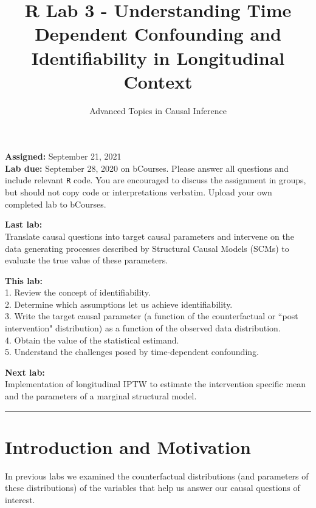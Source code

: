 \documentclass[answers]{exam}
\title{R Lab 3 - Understanding Time Dependent Confounding and Identifiability in Longitudinal Context}
\author{Advanced Topics in Causal Inference}
\date{}
\begin{document}
\maketitle



\noindent \textbf{Assigned:} September 21, 2021\\
\textbf{Lab due:} September 28, 2020 on bCourses. Please answer all questions and include relevant \texttt{R} code. You are encouraged to discuss the assignment in groups, but should not copy code or interpretations verbatim. Upload your own completed lab to bCourses.



\noindent \textbf{Last lab:} \\
Translate causal questions into target causal parameters and intervene on the data generating processes described by Structural Causal Models (SCMs) to evaluate the true value of these parameters. 


\noindent \textbf{This lab:}\\
1. Review the concept of identifiability. \\
2. Determine which assumptions let us achieve identifiability. \\
3. Write the target causal parameter (a function of the counterfactual or ``post intervention" distribution) as a function of the observed data distribution. \\
4. Obtain the value of the statistical estimand. \\
5. Understand the challenges posed by time-dependent confounding.

\noindent \textbf{Next lab:}\\
Implementation of longitudinal IPTW to estimate the intervention specific mean and the parameters of a marginal structural model.



\begin{center}
\noindent\rule{18cm}{0.4pt}
\end{center}

\section{Introduction and Motivation}

In previous labs we examined the counterfactual distributions (and parameters of these distributions) of the variables that help us answer our causal questions of interest. 
\end{document}
